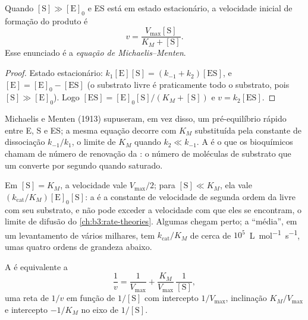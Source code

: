 \begin{theorem}\label{thm:b3:complex-kinetics:michaelis-menten}
Quando $[\mathrm S] \gg [\mathrm E]_0$ e ES está em estado estacionário, a velocidade inicial de
formação do produto é
\[
  v = \frac{V_{\max}[\mathrm S]}{K_M + [\mathrm S]} .
\]
Esse enunciado é a \emph{equação de Michaelis--Menten}.
\end{theorem}

\begin{proof}
Estado estacionário: $k_1[\mathrm E][\mathrm S] = (k_{-1} + k_2)[\mathrm{ES}]$, e $[\mathrm E] = [\mathrm E]_0 - [\mathrm{ES}]$ (o substrato
livre é praticamente todo o substrato, pois $[\mathrm S] \gg [\mathrm E]_0$). Logo $[\mathrm{ES}]
= [\mathrm E]_0[\mathrm S]/(K_M + [\mathrm S])$ e $v = k_2[\mathrm{ES}]$.
\end{proof}

\begin{remark}
Michaelis e Menten (1913) supuseram, em vez disso, um pré-equilíbrio rápido entre E,
S e ES; a mesma equação decorre com $K_M$ substituída pela constante de dissociação
$k_{-1}/k_1$, o limite de $K_M$ quando $k_2 \ll k_{-1}$. A  é o que os
bioquímicos chamam de número de renovação da : o número de moléculas de
substrato que um  converte por segundo quando saturado.
\end{remark}

Em $[\mathrm S] = K_M$, a velocidade vale $V_{\max}/2$; para $[\mathrm S] \ll K_M$, ela vale $(k_{\mathrm{cat}}/K_M)[\mathrm E]_0[\mathrm S]$: a
 é a constante de velocidade de segunda ordem da 
livre com seu substrato, e não pode exceder a velocidade com que eles se
encontram, o limite de difusão do \cref{ch:b3:rate-theories}. Algumas 
chegam perto; a  ``média'', em um levantamento de vários milhares, tem
$k_{\mathrm{cat}}/K_M$ de cerca de $10^5$~\unit{L.mol^{-1}.s^{-1}}, umas quatro ordens de grandeza abaixo.

\begin{proposition}\label{prop:b3:complex-kinetics:lineweaver}
A  é equivalente a
\[
  \frac1v = \frac{1}{V_{\max}} + \frac{K_M}{V_{\max}}\,\frac{1}{[\mathrm S]},
\]
uma reta de $1/v$ em função de $1/[\mathrm S]$ com intercepto $1/V_{\max}$, inclinação $K_M/V_{\max}$ e
intercepto $-1/K_M$ no eixo de $1/[\mathrm S]$.
\end{proposition}

